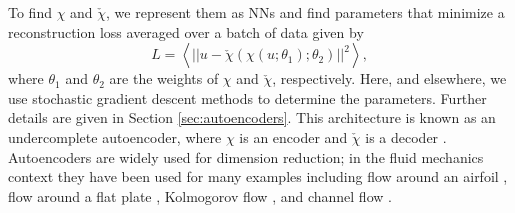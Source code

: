 \documentclass[preprint,aps,pre,letterpaper,onecolumn,superscriptaddress]{revtex4-2} %
\begin{document}




To find $\chi$ and $\check{\chi}$, we represent them as NNs and find parameters that minimize a reconstruction loss averaged over a batch of data given by 
	\begin{equation}\label{eq:Auto}
		L=\left<||u-\check{\chi}(\chi(u;\theta_1);\theta_2)||^2\right>,
	\end{equation}
where $\theta_1$ and $\theta_2$ are the weights of $\chi$ and $\check{\chi}$, respectively. Here, and elsewhere, we use stochastic gradient descent methods to determine the parameters. Further details are given in Section \ref{sec:autoencoders}.
	This architecture is known as an undercomplete autoencoder, where $\chi$ is an encoder and $\check{\chi}$ is a decoder \cite{IanGoodfellowYoshuaBengio2017}. Autoencoders are widely used for dimension reduction; in the fluid mechanics context they have been used for many examples including flow around an airfoil \cite{Omata2019}, flow around a flat plate \cite{Nair2020}, Kolmogorov flow \cite{Page2020}, and channel flow \cite{Milano2002,Fukami2020}.
	
\end{document}
